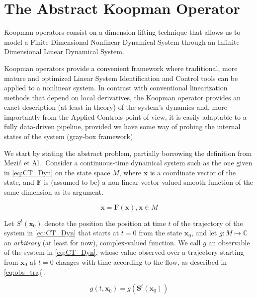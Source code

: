 \documentclass{article}
\begin{document}
\section{The Abstract Koopman Operator} \label{sec:Abstract}

    Koopman operators consist on a dimension lifting technique that allows us to model a Finite Dimensional Nonlinear Dynamical System through an Infinite Dimensional Linear Dynamical System.
    
    Koopman operators provide a convenient framework where traditional, more mature and optimized Linear System Identification and Control tools can be applied to a nonlinear system. In contrast with conventional linearization methods that depend on local derivatives, the Koopman operator provides an exact description (at least in theory) of the system's dynamics and, more importantly from the Applied Controls point of view, it is easily adaptable to a fully data-driven pipeline, provided we have some way of probing the internal states of the system (gray-box framework).

    We start by stating the abstract problem, partially borrowing the definition from Mezić et Al.\cite{Koopman_Basics}\cite{Applied_Koopmanism}. Consider a continuous-time dynamical system such as the one given in \cref{eq:CT_Dyn} on the state space $M$, where $\mathbf{x}$ is a coordinate vector of the state, and $\textbf{F}$ is (assumed to be) a non-linear vector-valued smooth function of the same dimension as its argument.

    \begin{equation} \label{eq:CT_Dyn}
        \mathbf{\dot{x}} = \mathbf{F}\left( \mathbf{x} \right) , \mathbf{x} \in M
    \end{equation}
    
    Let $S^t(\mathbf{x}_0)$ denote the position the position at time $t$ of the trajectory of the system in \cref{eq:CT_Dyn} that starts at $t=0$ from the state $\mathbf{x}_0$, and let $g:M \mapsto \mathbb{C}$ an \textit{arbitrary} (at least for now), complex-valued function. We call $g$ an observable of the system in \cref{eq:CT_Dyn}, whose value observed over a trajectory starting from $\mathbf{x}_0$ at $t=0$ changes with time according to the flow, as described in \cref{eq:obs_traj}.

    \begin{equation} \label{eq:obs_traj}
        g\left(t,\mathbf{x}_0\right) = g \left(\mathbf{S}^t\left(\mathbf{x}_0\right)\right)
    \end{equation}
    
\end{document}
